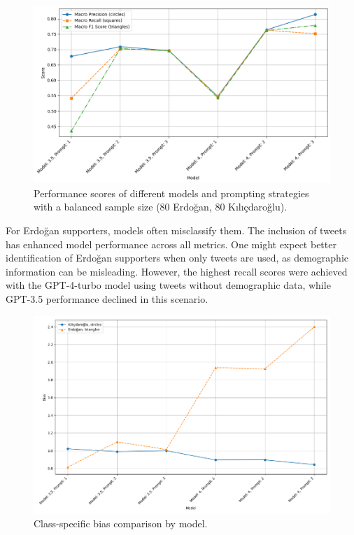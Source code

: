 \documentclass[sigconf,natbib=false]{acmart}
\begin{document}
\begin{figure}[ht]
  \centering
  \includegraphics[width=\linewidth]{graph3.png}
  \caption{Performance scores of different models and prompting strategies with a balanced sample size (80 Erdoğan, 80 Kılıçdaroğlu).}
  \label{fig:graph3}
\end{figure}

For Erdoğan supporters, models often misclassify them. The inclusion of tweets has enhanced model performance across all metrics. One might expect better identification of Erdoğan supporters when only tweets are used, as demographic information can be misleading. However, the highest recall scores were achieved with the GPT-4-turbo model using tweets without demographic data, while GPT-3.5 performance declined in this scenario.


\begin{figure}[ht]
  \centering
  \includegraphics[width=\linewidth]{graph4.png}
  \caption{Class-specific bias comparison by model.}
\end{figure}
\end{document}

